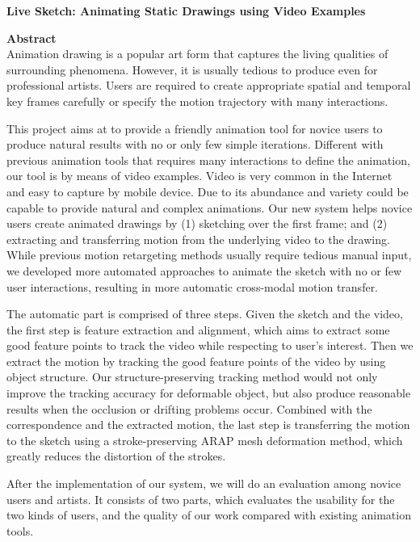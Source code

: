 {\bf Live Sketch: Animating Static Drawings using Video Examples} 

\textbf{Abstract}\\

Animation drawing is a popular art form that captures the living qualities of surrounding phenomena. However, it is usually tedious to produce even for professional artists. Users are required to create appropriate spatial and temporal key frames carefully or specify the motion trajectory with many interactions. 
 
This project aims at to provide a friendly animation tool for novice users to produce natural results with no or only few simple iterations. Different with previous animation tools that requires many interactions to define the animation, our tool is by means of video examples.  Video is very common in the Internet and easy to capture by mobile device. Due to its abundance and variety could be capable to provide natural and complex animations. Our new system helps novice users create animated drawings by (1) sketching over the first frame; and (2) extracting and transferring motion from the underlying video to the drawing. While previous motion retargeting methods usually require tedious manual input, we developed more automated approaches to animate the sketch with no or few user interactions, resulting in more automatic cross-modal motion transfer.

The automatic part is comprised of three steps.
Given the sketch and the video, the first step is feature extraction and alignment, which aims to extract some good feature points to track the video while respecting to user's interest.
Then we extract the motion by tracking the good feature points of the video by using object structure. Our structure-preserving tracking method would not only improve the tracking accuracy for deformable object, but also produce reasonable results when the occlusion or drifting problems occur. 
Combined with the correspondence and the extracted motion, the last step is transferring the motion to the sketch using a stroke-preserving ARAP mesh deformation method, which greatly reduces the distortion of the strokes.

After the implementation of our system, we will do an evaluation among novice users and artists. It consists of two parts, which evaluates the usability for the two kinds of users, and the quality of our work compared with existing animation tools.


